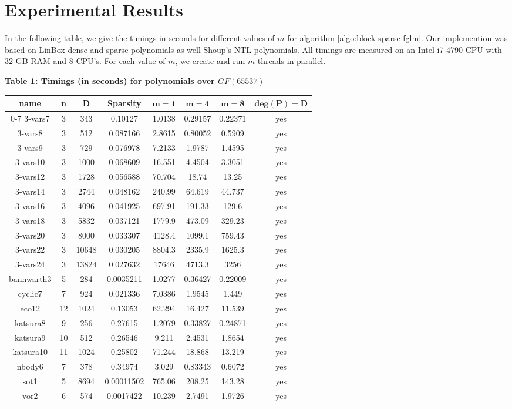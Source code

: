 \documentclass[12pt]{article}
\begin{document}
\section{Experimental Results}\label{section:ex}
In the following table, we give the timings in seconds for different values 
of $m$ for algorithm \ref{algo:block-sparse-fglm}. 
Our implemention was based on LinBox \cite{LinBox} dense and 
sparse polynomials as well Shoup's NTL \cite{NTL} polynomials. All timings
are measured on an Intel i7-4790 CPU with 32 GB RAM and 8 CPU's. For each
value of $m$, we create and run $m$ threads in parallel.
\bgroup
\def\arraystretch{1.5}
\setlength\tabcolsep{10pt}
\begin{center}
	\textbf{Table 1: Timings (in seconds) for polynomials over $GF(65537)$}
\begin{tabular}{c|c|c|c|c|c|c|c}
	\textbf{name}& n& $\mathbf{D}$ & \textbf{Sparsity} & $\mathbf{m = 1}$ & $\mathbf{m = 4}$ & $\mathbf{m = 8}$ & $\mathbf{deg(P) = D}$\\
	\hline{0-7}
	3-vars7&3 &343&0.10127&1.0138&0.29157&0.22371&yes\\
	3-vars8&3 &512&0.087166&2.8615&0.80052&0.5909&yes\\
	3-vars9&3 &729&0.076978&7.2133&1.9787&1.4595&yes\\
	3-vars10&3 &1000&0.068609&16.551&4.4504&3.3051&yes\\
	3-vars12&3 &1728&0.056588&70.704&18.74&13.25&yes\\
	3-vars14&3 &2744&0.048162&240.99&64.619&44.737&yes\\
	3-vars16&3 &4096&0.041925&697.91&191.33&129.6&yes\\
	3-vars18&3 &5832&0.037121&1779.9&473.09&329.23&yes\\
	3-vars20&3 &8000&0.033307&4128.4&1099.1&759.43&yes\\
	3-vars22&3 &10648&0.030205&8804.3&2335.9&1625.3&yes\\
	3-vars24&3 &13824&0.027632&17646&4713.3&3256&yes\\
	bannwarth3&5 &284&0.0035211&1.0277&0.36427&0.22009&yes\\
	cyclic7&7 &924&0.021336&7.0386&1.9545&1.449&yes\\
	eco12&12 &1024&0.13053&62.294&16.427&11.539&yes\\
	katsura8&9 &256&0.27615&1.2079&0.33827&0.24871&yes\\
	katsura9&10 &512&0.26546&9.211&2.4531&1.8654&yes\\
	katsura10&11 &1024&0.25802&71.244&18.868&13.219&yes\\
	nbody6&7 &378&0.34974&3.029&0.83343&0.6072&yes\\
	sot1&5 &8694&0.00011502&765.06&208.25&143.28&yes\\
	vor2&6 &574&0.0017422&10.239&2.7491&1.9726&yes\\
	
\end{tabular}
\end{center}
\end{document}
